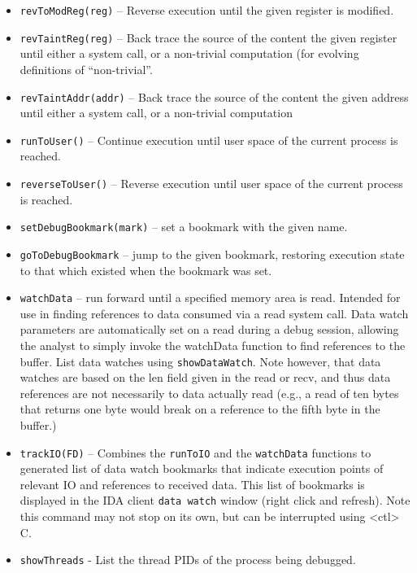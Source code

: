 \documentclass[titlepage]{article}
\begin{document}
\begin{itemize}
\item {\tt revToModReg(reg)} – Reverse execution until the given register is modified.

\item {\tt revTaintReg(reg)} – Back trace the source of the content the given register until either a system call, or a non-trivial computation (for evolving definitions of “non-trivial”.  

\item {\tt revTaintAddr(addr)} -- Back trace the source of the content the given address until either a system call, or a non-trivial computation

\item {\tt runToUser()} – Continue execution until user space of the current process is reached.

\item {\tt reverseToUser()} – Reverse execution until user space of the current process is reached.

\item {\tt setDebugBookmark(mark)} – set a bookmark with the given name.

\item {\tt goToDebugBookmark} – jump to the given bookmark, restoring execution state to that which existed when the bookmark was set.

\item {\tt watchData} – run forward until a specified memory area is read.  Intended for use in finding references to data consumed via a read system call.  Data watch parameters are automatically set on a read during a debug session, allowing the analyst to simply invoke the watchData function to find references to the buffer.  List data watches using {\tt showDataWatch}.
Note however, that data watches are based on the len field given in the read or recv, and thus data references are not necessarily to data actually read (e.g., a read of ten bytes
that returns one byte would break on a reference to the fifth byte in the buffer.)

\item {\tt trackIO(FD)} -- Combines the {\tt runToIO} and the {\tt watchData} functions to generated list of data watch bookmarks that indicate execution
points of relevant IO and references to received data.  This list of bookmarks is displayed in the IDA client {\tt data watch} window (right click and refresh).
Note this command may not stop on its own, but can be interrupted using <ctl> C.

\item {\tt showThreads} - List the thread PIDs of the process being debugged.


\end{itemize}
\end{document}
